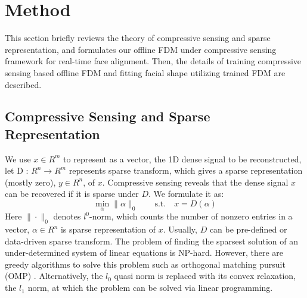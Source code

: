 \documentclass[a4paper, 10pt, conference]{ieeeconf}      %
\begin{document}
\section{Method}
This section briefly reviews the theory of compressive sensing and sparse representation,
and formulates our offline FDM under compressive sensing framework for real-time face alignment. Then,
the details of training compressive sensing based offline FDM and fitting facial shape utilizing trained FDM are described.
\subsection{Compressive Sensing and Sparse Representation}
We use $x\in R^m$ to represent as a vector, the 1D dense signal to be reconstructed, let D : $ R^n\rightarrow R^m$ represents sparse transform,
which gives a sparse representation (mostly zero), $y\in R^n$, of $x$.
Compressive sensing reveals that the dense signal $ x $ can be recovered if it is sparse under $D$. We formulate it as:
\begin{equation}
    \min_{\alpha} \| \alpha \|_{0} \quad \quad \text{s.t.}\quad x = D(\alpha)
\end{equation}
Here $\| \cdot \|_{0}$ denotes $l^0$-norm, which counts the number of nonzero entries in a vector, $\alpha \in R^n$ is sparse representation of $x$.
Usually, $D$ can be pre-defined or data-driven sparse transform. The problem of finding the sparsest solution of an under-determined system
of linear equations is NP-hard. However, there are greedy algorithms to solve this problem such as orthogonal matching pursuit (OMP)
\cite{perakis20133d}. Alternatively, the $l_0$ quasi norm is replaced with its convex relaxation, the $l_1$ norm, at which the problem
can be solved via linear programming.
\end{document}
